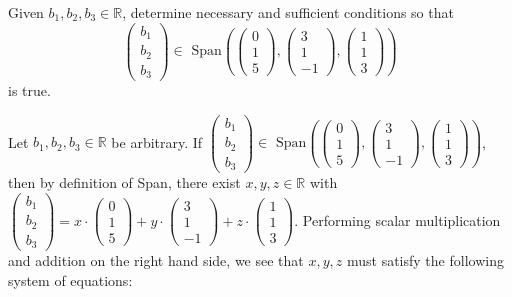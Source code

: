 \documentclass[12pt]{article}
\newenvironment{problem}[2][Problem]
{
	\begin{trivlist} 
		\item[\hskip \labelsep {\bfseries #1 #2:}]
	}
{
	\end{trivlist}
	}
\newenvironment{solution}[1][Solution]
{
	\begin{trivlist} 
		\item[\hskip \labelsep {\itshape #1:}]
	}
	{
	\end{trivlist}
}
\begin{document}
\newpage
\begin{problem}{2}
Given $b_1,b_2,b_3 \in \mathbb{R}$, determine necessary and sufficient conditions so that
\[
\begin{pmatrix}b_1\\b_2\\b_3\end{pmatrix} \in \text{ Span}\left(\begin{pmatrix}0\\1\\5\end{pmatrix}, \begin{pmatrix}3\\1\\-1\end{pmatrix}, \begin{pmatrix}1\\1\\3\end{pmatrix}\right)
\]
is true.
\noindent
\newline
\newline
\begin{solution}
Let $b_1,b_2,b_3 \in \mathbb{R}$ be arbitrary. If $\begin{pmatrix}b_1\\b_2\\b_3\end{pmatrix} \in \text{ Span}\left(\begin{pmatrix}0\\1\\5\end{pmatrix}, \begin{pmatrix}3\\1\\-1\end{pmatrix}, \begin{pmatrix}1\\1\\3\end{pmatrix}\right)$, then by definition of Span, there exist $x,y,z \in \mathbb{R}$ with $\begin{pmatrix}b_1\\b_2\\b_3\end{pmatrix} = x\cdot \begin{pmatrix}0\\1\\5\end{pmatrix} + y\cdot \begin{pmatrix}3\\1\\-1\end{pmatrix}+ z\cdot \begin{pmatrix}1\\1\\3\end{pmatrix}$. Performing scalar multiplication and addition on the right hand side, we see that $x,y,z$ must satisfy the following system of equations:

\end{solution}
\end{problem}
\end{document}

